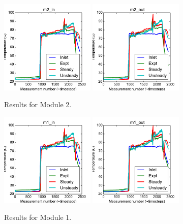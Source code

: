 \documentclass{article}
\begin{document}
\clearpage
\begin{figure}[!ht]
\centering
\includegraphics[width=0.4\textwidth]{../../data/ICSolar/images/Mar09_m2_in_compare.pdf}\hspace{0.05\textwidth}
\includegraphics[width=0.4\textwidth]{../../data/ICSolar/images/Mar09_m2_out_compare.pdf}\hspace{0.05\textwidth}\\
\caption{Results for Module 2.}\end{figure}
\begin{figure}[!ht]
\centering
\includegraphics[width=0.4\textwidth]{../../data/ICSolar/images/Mar09_m1_in_compare.pdf}\hspace{0.05\textwidth}
\includegraphics[width=0.4\textwidth]{../../data/ICSolar/images/Mar09_m1_out_compare.pdf}\hspace{0.05\textwidth}\\
\caption{Results for Module 1.}\end{figure}
\end{document}
